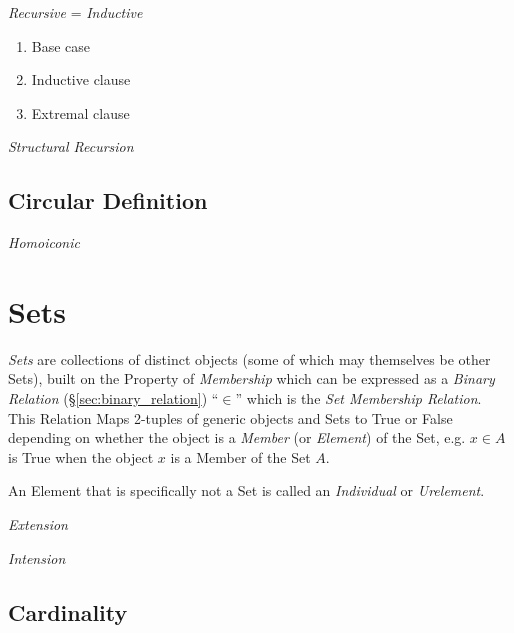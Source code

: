 \emph{Recursive} = \emph{Inductive}

\begin{enumerate}
    \item Base case
    \item Inductive clause
    \item Extremal clause
\end{enumerate}

\emph{Structural Recursion}



\subsection{Circular Definition}\label{sec:circular_definition}

\emph{Homoiconic}



\section{Sets}\label{sec:sets}

\emph{Sets} are collections of distinct objects (some of which may
themselves be other Sets), built on the Property of \emph{Membership}
which can be expressed as a \emph{Binary Relation}
(\S\ref{sec:binary_relation}) ``$\in$'' which is the \emph{Set
  Membership Relation}. This Relation Maps 2-tuples of generic objects
and Sets to True or False depending on whether the object is a
\emph{Member} (or \emph{Element}) of the Set, e.g. $x \in A$ is True
when the object $x$ is a Member of the Set $A$.

An Element that is specifically not a Set is called an
\emph{Individual} or \emph{Urelement}.

\emph{Extension}

\emph{Intension}



\subsection{Cardinality}

